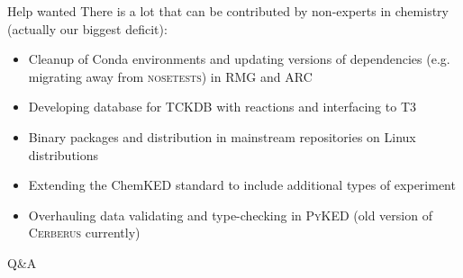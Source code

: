 \begin{frame}{Help wanted}
There is a lot that can be contributed by non-experts in chemistry (actually our biggest deficit):

\begin{itemize}
 \item Cleanup of Conda environments and updating versions of dependencies (e.g. migrating away from \textsc{nosetests}) in \textsc{RMG} and \textsc{ARC}
 \item Developing database for \textsc{TCKDB} with reactions and interfacing to \textsc{T3}
 \item Binary packages and distribution in mainstream repositories on Linux distributions
 \item Extending the ChemKED standard to include additional types of experiment
 \item Overhauling data validating and type-checking in \textsc{PyKED} (old version of \textsc{Cerberus} currently)
\end{itemize}

\end{frame}

\begin{frame}{Q\&A}
 
\end{frame}
